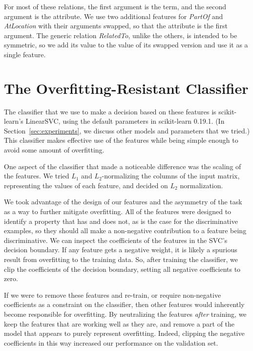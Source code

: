 \documentclass[11pt,a4paper]{article}
\begin{document}
For most of these relations, the first argument is the term, and the second
argument is the attribute. We use two additional features for \emph{PartOf} and
\emph{AtLocation} with their arguments swapped, so that the attribute is the
first argument. The generic relation \emph{RelatedTo}, unlike the others, is
intended to be symmetric, so we add its value to the value of its swapped
version and use it as a single feature.

\section{The Overfitting-Resistant Classifier}

The classifier that we use to make a decision based on these features is
scikit-learn's LinearSVC, using the default parameters in scikit-learn 0.19.1.
(In Section~\ref{sec:experiments}, we discuss other models and parameters that
we tried.) This classifier makes effective use of the features while being
simple enough to avoid some amount of overfitting.

One aspect of the classifier that made a noticeable difference was the
scaling of the features. We tried $L_1$ and $L_2$-normalizing the columns of
the input matrix, representing the values of each feature, and decided on
$L_2$ normalization.

We took advantage of the design of our features and the asymmetry of the task
as a way to further mitigate overfitting. All of the features were designed to
identify a property that \termOne{} has and \termTwo{} does not, as is the case
for the discriminative examples, so they should all make a non-negative
contribution to a feature being discriminative. We can inspect the coefficients
of the features in the SVC's decision boundary. If any feature gets a negative
weight, it is likely a spurious result from overfitting to the training data.
So, after training the classifier, we clip the coefficients of the decision
boundary, setting all negative coefficients to zero.

If we were to remove these features and re-train, or require non-negative
coefficients as a constraint on the classifier, then other features would
inherently become responsible for overfitting. By neutralizing the features
\emph{after} training, we keep the features that are working well as they are,
and remove a part of the model that appears to purely represent overfitting.
Indeed, clipping the negative coefficients in this way increased our
performance on the validation set.
\end{document}

